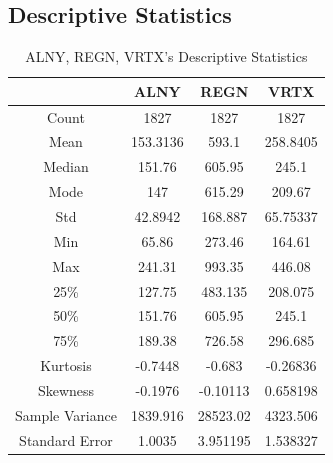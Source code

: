 \documentclass{ieeeojies}
\begin{document}
\subsection{Descriptive Statistics}
\begin{table}[H]
  \centering
  \caption{ALNY, REGN, VRTX’s Descriptive Statistics}
\begin{tabular}{|>{\columncolor{red!20}}c|c|c|c|}
    \hline
     \rowcolor{red!20} & ALNY & REGN & VRTX \\ \hline
        Count & 1827 & 1827 & 1827 \\
        Mean & 153.3136 & 593.1 & 258.8405 \\
        Median & 151.76 & 605.95 & 245.1 \\
        Mode & 147 & 615.29 & 209.67 \\
        Std & 42.8942 & 168.887 & 65.75337 \\
        Min & 65.86 & 273.46 & 164.61 \\
        Max & 241.31 & 993.35 & 446.08 \\
        25\% & 127.75 & 483.135 & 208.075 \\
        50\% & 151.76 & 605.95 & 245.1 \\
        75\% & 189.38 & 726.58 & 296.685 \\
        Kurtosis & -0.7448 & -0.683 & -0.26836 \\
        Skewness & -0.1976 & -0.10113 & 0.658198 \\
        Sample Variance & 1839.916 & 28523.02 & 4323.506 \\
        Standard Error & 1.0035 & 3.951195 & 1.538327 \\
\hline
   
\end{tabular}
\end{table}
\end{document}
